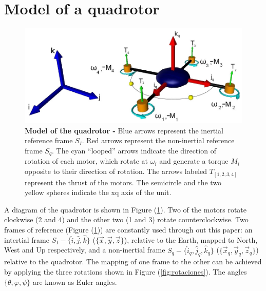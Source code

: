 \documentclass[conference]{IEEEtran}
\newcommand{\refp}[1]{(\ref{#1})}
\begin{document}
\section{Model of a quadrotor}
\label{sec:modelo}
\begin{figure}[t]
	\centering
	\includegraphics[width=.7\columnwidth]{./pics_paper/quad_coord.jpg}
	\vspace{-5pt}
	\caption{\textbf{Model of the quadrotor -} Blue arrows represent
the inertial reference frame $S_I$. Red arrows represent
the non-inertial reference frame $S_q$. The cyan ``looped'' arrows
indicate the direction of rotation of each motor, which rotate
at $\omega_i$ and generate a torque $M_i$ opposite to their direction of
rotation. The arrows labeled $T_{[1,2,3,4]}$ represent the thrust of
the motors. The semicircle and the two yellow spheres indicate
the xq axis of the unit.}
	\label{fig:quad}
	\vspace{-0.5cm}
\end{figure}

A diagram of the quadrotor is shown in Figure \refp{fig:quad}. Two of the motors rotate clockwise (2 and 4) and the other two (1 and 3) rotate counterclockwise. Two frames of reference (Figure \refp{fig:quad}) are constantly used through out this paper: an intertial frame $S_I - \lbrace \hat{i},\hat{j},\hat{k}\rbrace$ ($\lbrace \vec{x},\vec{y},\vec{z}\rbrace$), relative to the Earth, mapped to  North, West and Up respectively, and a non-inertial frame $S_q - \lbrace \hat{i}_q,\hat{j}_q,\hat{k}_q\rbrace$ ($\lbrace \vec{x}_q,\vec{y}_q,\vec{z}_q\rbrace$) relative to the quadrotor. The mapping of one frame to the other can be achieved by applying the three rotations shown in Figure \refp{fig:rotaciones}. The angles $\lbrace \theta, \varphi, \psi\rbrace$ are known as Euler angles.
\end{document}
